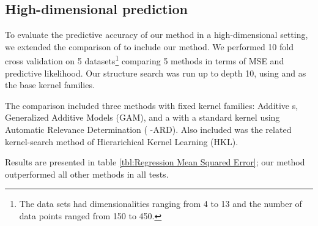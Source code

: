 \documentclass[twoside]{article}
\renewcommand{\fTBD}[1]{}
\begin{document}
\subsection{High-dimensional prediction}

To evaluate the predictive accuracy of our method in a high-dimensional setting, we extended the comparison of \cite{duvenaud2011additive11} to include our method.
We performed 10 fold cross validation on 5 datasets\footnote{The data sets had dimensionalities ranging from 4 to 13 and the number of data points ranged from 150 to 450.} comparing 5 methods in terms of MSE and predictive likelihood.
Our structure search was run up to depth 10, using \kSE{} and \kRQ{} as the base kernel families.

The comparison included three methods with fixed kernel families: Additive \gp{}s, Generalized Additive Models (GAM), and a \gp{} with a standard \kSE{} kernel using Automatic Relevance Determination (\gp{} \kSE{}-ARD).  Also included was the related kernel-search method of Hierarichical Kernel Learning (HKL).


Results are presented in table \ref{tbl:Regression Mean Squared Error}; our method outperformed all other methods in all tests.

%
%
%

%

%
%
%
%
\end{document}

